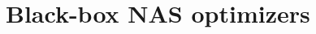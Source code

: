 \renewcommand{\lecturetitle}{Black-box NAS optimizers}
\renewcommand{\lecturetime}{Week 9, Video 3}
\section{\lecturetitle}


